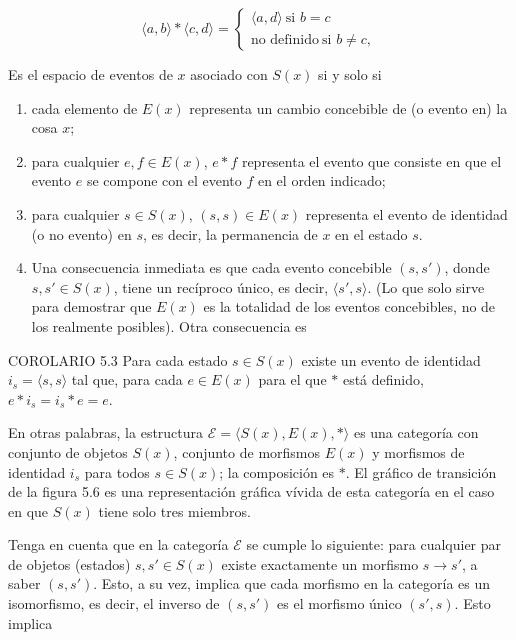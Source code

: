 \begin{justifying}
	\[
	\langle a, b \rangle * \langle c, d \rangle =
	\begin{cases}
	\langle a, d \rangle \: \text{si } b = c \\
	\text{no definido} \: \text{si } b \neq c,
	\end{cases}
	\]

	\noindent Es el espacio de eventos de $x$ asociado con $S(x)$ si y solo si
	\begin{enumerate}[label=(\roman*), itemsep=0pt, parsep=0pt]
		\item  cada elemento de $E(x)$ representa un cambio concebible de (o evento en) la cosa $x$;
		\item para cualquier $e, f \in E(x)$, $e * f$ representa el evento que consiste en que
		el evento $e$ se compone con el evento $f$ en el orden indicado;
		\item para cualquier $s \in S(x)$, $(s, s) \in E(x)$ representa el evento de identidad 
		(o no evento) en $s$, es decir, la permanencia de $x$ en el estado $s$.
		\item Una consecuencia inmediata es que cada evento concebible $(s, s')$,
		donde $s, s' \in S(x)$, tiene un recíproco único, es decir, $\langle s', s \rangle$. (Lo que solo sirve
		para demostrar que $E(x)$ es la totalidad de los eventos concebibles, no de los realmente
		posibles). Otra consecuencia es
	\end{enumerate}

	\noindent COROLARIO 5.3 Para cada estado $s \in S(x)$ existe un evento de identidad
	$i_s = \langle s, s \rangle$ tal que, para cada $e \in E(x)$ para el que $*$ está definido, $e * i_s =
	i_s * e = e$.

	En otras palabras, la estructura $\mathscr{E} = \langle S(x), E(x), * \rangle$ es una categoría con conjunto
	de objetos $S(x)$, conjunto de morfismos $E(x)$ y morfismos de identidad $i_s$ para todos
	$s \in S(x)$; la composición es $*$. El gráfico de transición de la figura 5.6 es una
	representación gráfica vívida de esta categoría en el caso en que $S(x)$ tiene
	solo tres miembros.

	Tenga en cuenta que en la categoría $\mathscr{E}$ se cumple lo siguiente: para cualquier par de objetos
	(estados) $s, s' \in S(x)$ existe exactamente un morfismo $s \to s'$, a saber $(s, s')$.
	Esto, a su vez, implica que cada morfismo en la categoría es un isomorfismo,
	es decir, el inverso de $(s, s')$ es el morfismo único $(s', s)$. Esto implica

	\bigskip


\end{justifying}
